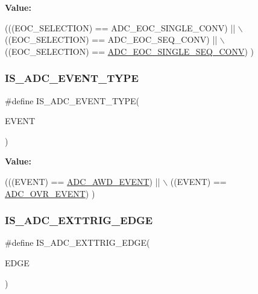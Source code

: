 {\bfseries Value\+:}
\begin{DoxyCode}
(((EOC\_SELECTION) == ADC\_EOC\_SINGLE\_CONV)    || \(\backslash\)
                                             ((EOC\_SELECTION) == ADC\_EOC\_SEQ\_CONV)       || \(\backslash\)
                                             ((EOC\_SELECTION) == 
      \hyperlink{group___a_d_c___e_o_c_selection_ga0cbb4e6ee76ee1bef233212bf947d320}{ADC\_EOC\_SINGLE\_SEQ\_CONV})  )
\end{DoxyCode}
\mbox{\label{group___a_d_c___private___macros_ga26fd0ba397566ade5d960ff29bccbc31}} 
\subsubsection{\texorpdfstring{I\+S\+\_\+\+A\+D\+C\+\_\+\+E\+V\+E\+N\+T\+\_\+\+T\+Y\+PE}{IS\_ADC\_EVENT\_TYPE}}
{\footnotesize\ttfamily \#define I\+S\+\_\+\+A\+D\+C\+\_\+\+E\+V\+E\+N\+T\+\_\+\+T\+Y\+PE(\begin{DoxyParamCaption}\item[{}]{E\+V\+E\+NT }\end{DoxyParamCaption})}

{\bfseries Value\+:}
\begin{DoxyCode}
(((EVENT) == \hyperlink{group___a_d_c___event__type_ga2d1d545ea1bfecba7a7081be6ef2cb93}{ADC\_AWD\_EVENT}) || \(\backslash\)
                                  ((EVENT) == \hyperlink{group___a_d_c___event__type_gae1ef5aaecb2d24cac50a59f1bc311221}{ADC\_OVR\_EVENT})   )
\end{DoxyCode}
\mbox{\label{group___a_d_c___private___macros_gaa862868aea997c7a9e1c808faee75e6c}} 
\subsubsection{\texorpdfstring{I\+S\+\_\+\+A\+D\+C\+\_\+\+E\+X\+T\+T\+R\+I\+G\+\_\+\+E\+D\+GE}{IS\_ADC\_EXTTRIG\_EDGE}}
{\footnotesize\ttfamily \#define I\+S\+\_\+\+A\+D\+C\+\_\+\+E\+X\+T\+T\+R\+I\+G\+\_\+\+E\+D\+GE(\begin{DoxyParamCaption}\item[{}]{E\+D\+GE }\end{DoxyParamCaption})}


